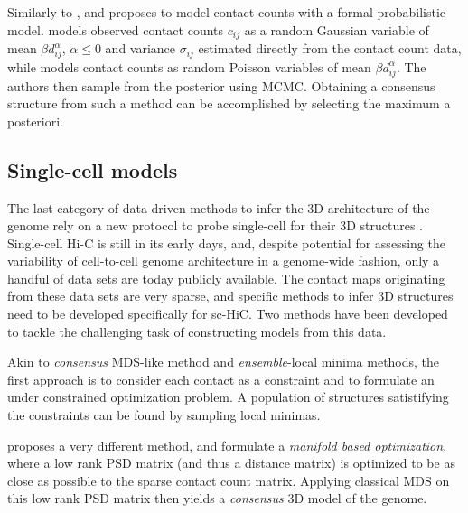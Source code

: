 \documentclass[letterpaper,12pt]{article}
\begin{document}
Similarly to \citet{varoquaux:statistical}, \citet{rousseau:three} and
\citet{hu:bayesian} proposes to model contact counts with a formal
probabilistic model. \citet{rousseau:three} models observed contact counts
$c_{ij}$ as a random Gaussian variable of mean $\beta d_{ij}^{\alpha}$,
$\alpha \leq 0$ and variance $\sigma_{ij}$ estimated directly from the contact
count data, while \citet{hu:bayesian} models contact counts as random Poisson
variables of mean $\beta d_{ij}^\alpha$. The authors then sample from the
posterior using MCMC. Obtaining a consensus structure from such a method can
be accomplished by selecting the maximum a posteriori.

\subsection*{Single-cell models}

The last category of data-driven methods to infer the 3D architecture of the
genome rely on a new protocol to probe single-cell for their 3D structures
\citep{nagano:single-cell,ramani:massively}. Single-cell Hi-C is still in its
early days, and, despite potential for assessing the variability of
cell-to-cell genome architecture in a genome-wide fashion, only a handful of
data sets are today publicly available. The contact maps originating from
these data sets are very sparse, and specific methods to infer 3D structures
need to be developed specifically for sc-HiC. Two methods have been developed
to tackle the challenging task of constructing models from this data.

Akin to {\em consensus} MDS-like method and {\em ensemble}-local minima
methods,  the first approach is to consider each contact as a constraint and
to formulate an under constrained optimization problem. A population of
structures satistifying the constraints can be found by sampling local
minimas.

\citet{paulsen:manifold} proposes a very different method, and formulate a
\textit{manifold based optimization}, where a low rank PSD matrix (and thus a
distance matrix) is optimized to be as close as possible to the sparse contact
count matrix. Applying classical MDS on this low rank PSD matrix then yields a
\textit{consensus} 3D model of the genome.
\end{document}
